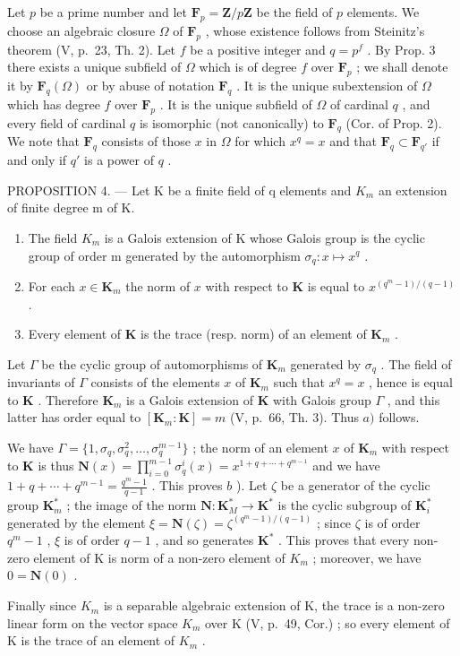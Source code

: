 Let \(p\) be a prime number and let \(\mathbf{F}_p = \mathbf{Z} / p\mathbf{Z}\) be the field of \(p\) elements. We choose an algebraic closure \(\Omega\) of \(\mathbf{F}_p\) , whose existence follows from Steinitz's theorem (V, p.~23, Th. 2). Let \(f\) be a positive integer and \(q = p^f\) . By Prop. 3 there exists a unique subfield of \(\Omega\) which is of degree \(f\) over \(\mathbf{F}_p\) ; we shall denote it by \(\mathbf{F}_q(\Omega)\) or by abuse of notation \(\mathbf{F}_q\) . It is the unique subextension of \(\Omega\) which has degree \(f\) over \(\mathbf{F}_p\) . It is the unique subfield of \(\Omega\) of cardinal \(q\) , and every field of cardinal \(q\) is isomorphic (not canonically) to \(\mathbf{F}_q\) (Cor. of Prop. 2). We note that \(\mathbf{F}_q\) consists of those \(x\) in \(\Omega\) for which \(x^q = x\) and that \(\mathbf{F}_q \subset \mathbf{F}_{q'}\) if and only if \(q'\) is a power of \(q\) .

PROPOSITION 4. --- Let K be a finite field of q elements and \(K_{m}\) an extension of finite degree m of K.

\begin{enumerate}
\def\labelenumi{\alph{enumi})}
\item
  The field \(K_{m}\) is a Galois extension of K whose Galois group is the cyclic group of order m generated by the automorphism \(\sigma_{q}: x \mapsto x^{q}\) .
\item
  For each \(x \in \mathbf{K}_m\) the norm of \(x\) with respect to \(\mathbf{K}\) is equal to \(x^{(q^m - 1) / (q - 1)}\) .
\item
  Every element of \(\mathbf{K}\) is the trace (resp. norm) of an element of \(\mathbf{K}_m\) .
\end{enumerate}

Let \(\Gamma\) be the cyclic group of automorphisms of \(\mathbf{K}_m\) generated by \(\sigma_q\) . The field of invariants of \(\Gamma\) consists of the elements \(x\) of \(\mathbf{K}_m\) such that \(x^q = x\) , hence is equal to \(\mathbf{K}\) . Therefore \(\mathbf{K}_m\) is a Galois extension of \(\mathbf{K}\) with Galois group \(\Gamma\) , and this latter has order equal to \([\mathbf{K}_m: \mathbf{K}] = m\) (V, p.~66, Th. 3). Thus \(a)\) follows.

We have \(\Gamma = \{1, \sigma_q, \sigma_q^2, \ldots, \sigma_q^{m-1}\}\) ; the norm of an element \(x\) of \(\mathbf{K}_m\) with respect to \(\mathbf{K}\) is thus \(\mathbf{N}(x) = \prod_{i=0}^{m-1} \sigma_q^i(x) = x^{1+q+\cdots+q^{m-1}}\) and we have \(1 + q + \cdots + q^{m-1} = \frac{q^m - 1}{q - 1}\) . This proves \(b\) ). Let \(\zeta\) be a generator of the cyclic group \(\mathbf{K}_m^*\) ; the image of the norm \(\mathbf{N}: \mathbf{K}_M^* \to \mathbf{K}^*\) is the cyclic subgroup of \(\mathbf{K}_i^*\) generated by the element \(\xi = \mathbf{N}(\zeta) = \zeta^{(q^m - 1)/(q - 1)}\) ; since \(\zeta\) is of order \(q^m - 1\) , \(\xi\) is of order \(q - 1\) , and so generates \(\mathbf{K}^*\) . This proves that every non-zero element of K is norm of a non-zero element of \(K_{m}\) ; moreover, we have \(0 = \mathbf{N}(0)\) .

Finally since \(K_{m}\) is a separable algebraic extension of K, the trace is a non-zero linear form on the vector space \(K_{m}\) over K (V, p.~49, Cor.) ; so every element of K is the trace of an element of \(K_{m}\) .
\relax{}
